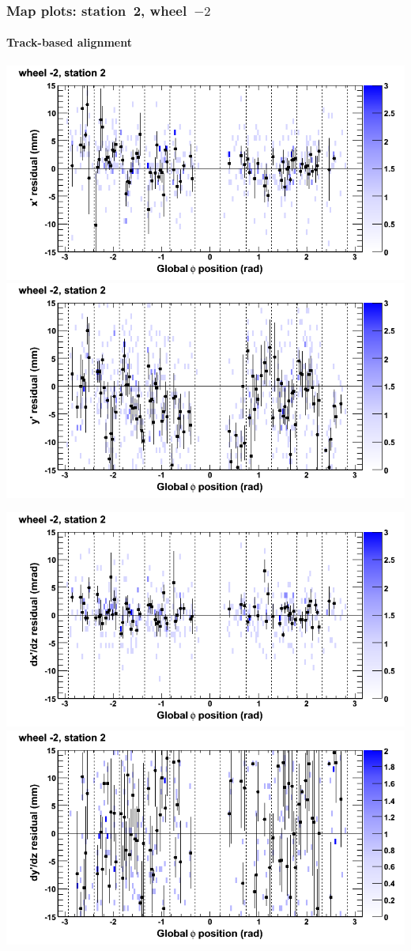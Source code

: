 \documentclass[compress]{beamer}
\begin{document}
\begin{frame}
\frametitle{Map plots: station~2, wheel~$-2$}
\framesubtitle{Track-based alignment}
\includegraphics[width=0.5\linewidth]{mapplots_re05/DTvsphi_st2whA_x.png}
\includegraphics[width=0.5\linewidth]{mapplots_re05/DTvsphi_st2whA_y.png}

\includegraphics[width=0.5\linewidth]{mapplots_re05/DTvsphi_st2whA_dxdz.png}
\includegraphics[width=0.5\linewidth]{mapplots_re05/DTvsphi_st2whA_dydz.png}
\end{frame}
\end{document}
